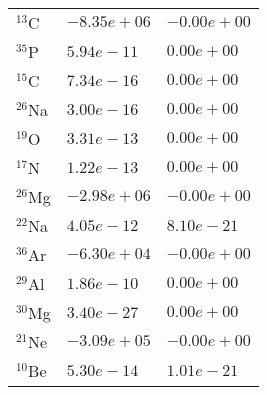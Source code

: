 \begin{tabular}{lll}
 $^{13}$C  & $-8.35e+06 $                                                       & $-0.00e+00 $                                                                    \\
 $^{35}$P  & $5.94e-11 $                                                        & $0.00e+00 $                                                                     \\
 $^{15}$C  & $7.34e-16 $                                                        & $0.00e+00 $                                                                     \\
 $^{26}$Na & $3.00e-16 $                                                        & $0.00e+00 $                                                                     \\
 $^{19}$O  & $3.31e-13 $                                                        & $0.00e+00 $                                                                     \\
 $^{17}$N  & $1.22e-13 $                                                        & $0.00e+00 $                                                                     \\
 $^{26}$Mg & $-2.98e+06 $                                                       & $-0.00e+00 $                                                                    \\
 $^{22}$Na & $4.05e-12 $                                                        & $8.10e-21 $                                                                     \\
 $^{36}$Ar & $-6.30e+04 $                                                       & $-0.00e+00 $                                                                    \\
 $^{29}$Al & $1.86e-10 $                                                        & $0.00e+00 $                                                                     \\
 $^{30}$Mg & $3.40e-27 $                                                        & $0.00e+00 $                                                                     \\
 $^{21}$Ne & $-3.09e+05 $                                                       & $-0.00e+00 $                                                                    \\
 $^{10}$Be & $5.30e-14 $                                                        & $1.01e-21 $                                                                     \\

\end{tabular}
